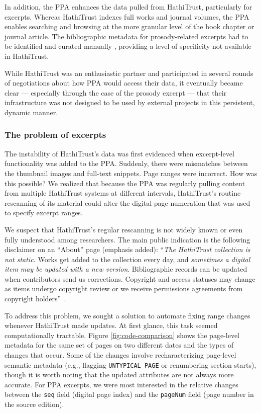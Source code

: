 \documentclass[final]{anthology-ch} %
\begin{document}
In addition, the PPA enhances the data pulled from HathiTrust, particularly for excerpts. Whereas HathiTrust indexes full works and journal volumes, the PPA enables searching and browsing at the more granular level of the book chapter or journal article. The bibliographic metadata for prosody-related excerpts had to be identified and curated manually \cite{naydan_book_2024}, providing a level of specificity not available in HathiTrust.

While HathiTrust was an enthusiastic partner and participated in several rounds of negotiations about how PPA would access their data, it eventually became clear — especially through the case of the prosody excerpt — that their infrastructure was not designed to be used by external projects in this persistent, dynamic manner. 

\subsubsection{The problem of excerpts}

The instability of HathiTrust's data was first evidenced when excerpt-level functionality was added to the PPA. Suddenly, there were mismatches between the thumbnail images and full-text snippets. Page ranges were incorrect. How was this possible? We realized that because the PPA was regularly pulling content from multiple HathiTrust systems at different intervals, HathiTrust's routine rescanning of its material could alter the digital page numeration that was used to specify excerpt ranges.

We suspect that HathiTrust's regular rescanning is not widely known or even fully understood among researchers. The main public indication is the following disclaimer on an ``About'' page (emphasis added): ``\textit{The HathiTrust collection is not static.} Works get added to the collection every day, and \textit{sometimes a digital item may be updated with a new version}. Bibliographic records can be updated when contributors send us corrections. Copyright and access statuses may change as items undergo copyright review or we receive permissions agreements from copyright holders'' \cite{noauthor_how_nodate}. 

To address this problem, we sought a solution to automate fixing range changes whenever HathiTrust made updates. At first glance, this task seemed computationally tractable. Figure  \ref{fig:code-comparison} shows the page-level metadata for the same set of pages on two different dates and the types of changes that occur. Some of the changes involve recharacterizing page-level semantic metadata (e.g., flagging \texttt{UNTYPICAL\_PAGE} or renumbering section starts), though it is worth noting that the updated attributes are not always more accurate. For PPA excerpts, we were most interested in the relative changes between the \texttt{seq} field (digital page index) and the \texttt{pageNum} field (page number in the source edition).
\end{document}
